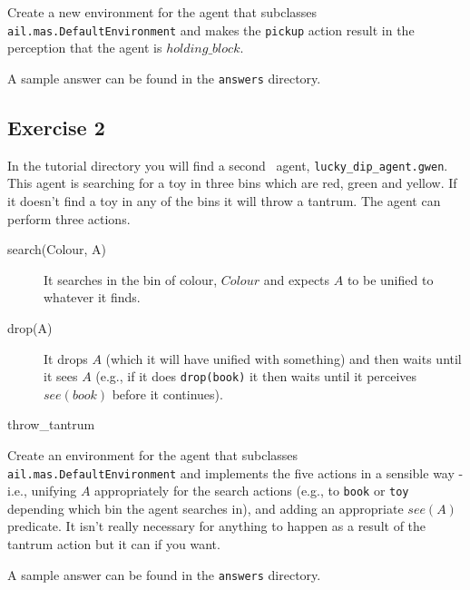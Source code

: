 \begin{sloppypar}
Create a new environment for the agent that subclasses \texttt{ail.mas.DefaultEnvironment} and makes the \texttt{pickup} action result in the perception that the agent is $holding\_block$.
\end{sloppypar}

A sample answer can be found in the \texttt{answers} directory.

\subsection{Exercise 2}
\begin{sloppypar}
In the tutorial directory you will find a second \gwendolen\ agent, \texttt{lucky\_dip\_agent.gwen}.  This agent is searching for a toy in three bins which are red, green and yellow.  If it doesn't find a toy in any of the bins it will throw a tantrum.  The agent can perform three actions.
\end{sloppypar}

\begin{description}
\item[search(Colour, A)] It searches in the bin of colour, $Colour$ and expects $A$ to be unified to whatever it finds. 
\item[drop(A)] It drops $A$ (which it will have unified with something) and then waits until it sees $A$ (e.g., if it does \texttt{drop(book)} it then waits until it perceives $see(book)$ before it continues).
\item[throw\_tantrum]
\end{description}

\begin{sloppypar}
Create an environment for the agent that subclasses \texttt{ail.mas.DefaultEnvironment} and implements the five actions in a sensible way - i.e., unifying $A$ appropriately for the search actions (e.g., to \texttt{book} or \texttt{toy} depending which bin the agent searches in), and adding an appropriate $see(A)$ predicate.  It isn't really necessary for anything to happen as a result of the tantrum action but it can if you want.
\end{sloppypar}

A sample answer can be found in the \texttt{answers} directory.

